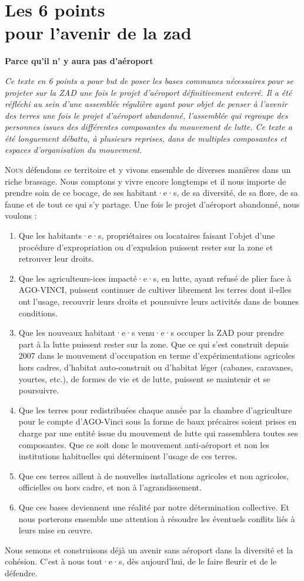 \chapter[Les 6 points pour l'avenir de la zad]{Les 6 points\\pour l'avenir de la zad} 
\centerline{\textbf{\Large Parce qu'il n' y aura pas d'aéroport}}
\vspace{\baselineskip}
\textit{Ce texte en 6 points a pour but de poser les bases communes nécessaires pour se projeter sur la ZAD une fois
le projet d’aéroport définitivement enterré.
Il a été réfléchi au sein d’une assemblée régulière ayant pour objet de penser à l’avenir des terres une fois le
projet d’aéroport abandonné, l'assemblée qui regroupe des personnes issues des différentes composantes du
mouvement de lutte. Ce texte a été longuement débattu, à plusieurs reprises, dans de multiples composantes et
espaces d’organisation du mouvement.\\}

\lettrine{N}{ous} défendons ce territoire et y vivons ensemble de diverses manières dans un riche brassage.
Nous comptons y vivre encore longtemps et il nous importe de prendre soin de ce bocage, de ses
habitant·e·s, de sa diversité, de sa flore, de sa faune et de tout ce qui s'y partage. 
Une fois le projet d’aéroport abandonné, nous voulons :

\begin{enumerate}
\item Que les habitants·e·s, propriétaires ou locataires faisant l'objet d'une procédure d'expropriation ou d'expulsion puissent rester sur la zone et retrouver leur droits.
\item Que les agriculteurs-ices impacté·e·s, en lutte, ayant refusé de plier face
à AGO-VINCI, puissent continuer de cultiver librement les terres dont il-elles ont l’usage, recouvrir leurs droits et poursuivre leurs activités dans
de bonnes conditions.
\item Que les nouveaux habitant·e·s venu·e·s occuper la ZAD pour prendre
part à la lutte puissent rester sur la zone. Que ce qui s’est construit
depuis 2007 dans le mouvement d’occupation en terme d’expérimentations
agricoles hors cadres, d’habitat auto-construit ou d’habitat léger (cabanes,
caravanes, yourtes, etc.), de formes de vie et de lutte, puissent se maintenir
et se poursuivre.
\item Que les  terres pour redistribuées chaque année par la  chambre d’agriculture pour le compte d'AGO-Vinci sous la forme de baux précaires soient prises en charge par une entité issue du mouvement de lutte qui rassemblera toutes ses composantes. Que ce soit donc le mouvement anti-aéroport et non les institutions habituelles qui déterminent l’usage de ces terres.
\item Que ces terres aillent à de nouvelles installations agricoles et non
agricoles, officielles ou hors cadre, et non à l’agrandissement.
\item Que ces bases deviennent une réalité par notre détermination
collective. Et nous porterons ensemble une attention à résoudre les
éventuels conflits liés à leurs mise en œuvre.
\end{enumerate}

Nous semons et construisons déjà un avenir sans aéroport dans la diversité et la cohésion. C’est
à nous tout·e·s, dès aujourd’hui, de le faire fleurir et de le défendre.